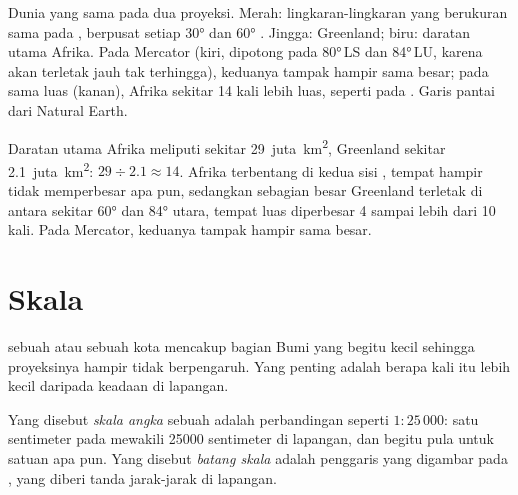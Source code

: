 \begin{omfigure}
{\small Dunia yang sama pada dua proyeksi. Merah: lingkaran-lingkaran yang
berukuran sama pada , berpusat setiap \ang{30}  dan
\ang{60} . Jingga: Greenland; biru: daratan utama Afrika. Pada 
Mercator (kiri, dipotong pada \ang{80}\,LS dan \ang{84}\,LU, karena 
akan terletak jauh tak terhingga), keduanya tampak hampir sama besar; pada
 sama luas (kanan), Afrika sekitar 14 kali lebih luas, seperti pada
. Garis pantai dari Natural Earth.}
\label{fig:g9:maps-of-the-earth:projections}
\end{omfigure}

\begin{example}
Daratan utama Afrika meliputi sekitar 29~juta~\unit{km^2}, Greenland
sekitar 2.1~juta~\unit{km^2}: $29 \div 2.1 \approx 14$. Afrika terbentang
di kedua sisi , tempat  hampir tidak
memperbesar apa pun, sedangkan sebagian besar Greenland terletak di antara
sekitar \ang{60} dan \ang{84}  utara, tempat luas diperbesar 4
sampai lebih dari 10 kali. Pada  Mercator, keduanya tampak hampir sama
besar.
\end{example}

\section{Skala}

 sebuah  atau sebuah kota mencakup bagian Bumi yang begitu kecil
sehingga proyeksinya hampir tidak berpengaruh. Yang penting adalah berapa
kali  itu lebih kecil daripada keadaan di lapangan.

\begin{definition}\label{def:g9:maps-of-the-earth:numerical-scale}
Yang disebut \emph{skala angka} sebuah  adalah
perbandingan seperti $1 : 25\,000$: satu sentimeter pada  mewakili
\num{25000} sentimeter di lapangan, dan begitu pula untuk satuan apa pun.
Yang disebut \emph{batang skala} adalah penggaris yang
digambar pada , yang diberi tanda jarak-jarak di lapangan.
\end{definition}

